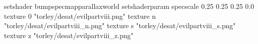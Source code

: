setshader bumpspecmapparallaxworld
setshaderparam specscale 0.25 0.25 0.25 0.0
texture 0 "torley/desat/evilpartviii.png"
texture n "torley/desat/evilpartviii_n.png"
texture s "torley/desat/evilpartviii_s.png"
texture z "torley/desat/evilpartviii_z.png"

